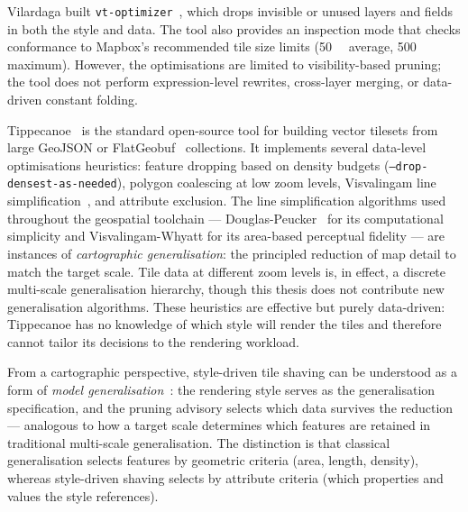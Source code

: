 Vilardaga built \texttt{vt-optimizer}~\cite{vilardagaVtoptimizerVectorTile2023}, which drops invisible or unused layers and fields in both the style and data.
The tool also provides an inspection mode that checks conformance to Mapbox's recommended tile size limits (\qty{50}{\kilo\byte} average, \qty{500}{\kilo\byte} maximum).
However, the optimisations are limited to visibility-based pruning; the tool does not perform expression-level rewrites, cross-layer merging, or data-driven constant folding.

Tippecanoe~\cite{FeltTippecanoe2026} is the standard open-source tool for building vector tilesets from large GeoJSON or FlatGeobuf~\cite{flatgeobuf2018} collections.
It implements several data-level optimisations heuristics: feature dropping based on density budgets (\texttt{--drop-densest-as-needed}), polygon coalescing at low zoom levels, Visvalingam line simplification~\cite{visvalingamLineGeneralisationRepeated1993}, and attribute exclusion.
The line simplification algorithms used throughout the geospatial toolchain --- Douglas-Peucker~\cite{douglasAlgorithmsReductionNumber1973} for its computational simplicity and Visvalingam-Whyatt for its area-based perceptual fidelity --- are instances of \emph{cartographic generalisation}: the principled reduction of map detail to match the target scale.
Tile data at different zoom levels is, in effect, a discrete multi-scale generalisation hierarchy, though this thesis does not contribute new generalisation algorithms.
These heuristics are effective but purely data-driven: Tippecanoe has no knowledge of which style will render the tiles and therefore cannot tailor its decisions to the rendering workload.

From a cartographic perspective, style-driven tile shaving can be understood as a form of \emph{model generalisation}~\cite{mcmasterGeneralizationDigitalCartography1992}: the rendering style serves as the generalisation specification, and the pruning advisory selects which data survives the reduction --- analogous to how a target scale determines which features are retained in traditional multi-scale generalisation.
The distinction is that classical generalisation selects features by geometric criteria (area, length, density), whereas style-driven shaving selects by attribute criteria (which properties and values the style references).

